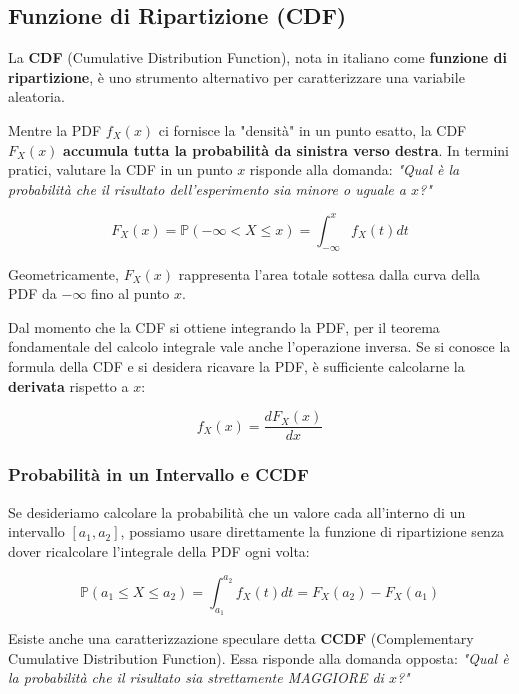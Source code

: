 \subsection{Funzione di Ripartizione (CDF)}

La \textbf{CDF} (Cumulative Distribution Function), nota in italiano come \textbf{funzione di ripartizione}, è uno strumento alternativo per caratterizzare una variabile aleatoria. 

Mentre la PDF $f_X(x)$ ci fornisce la "densità" in un punto esatto, la CDF $F_X(x)$ \textbf{accumula tutta la probabilità da sinistra verso destra}.
In termini pratici, valutare la CDF in un punto $x$ risponde alla domanda: \textit{"Qual è la probabilità che il risultato dell'esperimento sia minore o uguale a $x$?"}

\begin{equation}
F_X(x) = \mathbb{P}(-\infty < X \le x) = \int_{-\infty}^{x} f_X(t) dt
\end{equation}

Geometricamente, $F_X(x)$ rappresenta l'area totale sottesa dalla curva della PDF da $-\infty$ fino al punto $x$.

Dal momento che la CDF si ottiene integrando la PDF, per il teorema fondamentale del calcolo integrale vale anche l'operazione inversa. Se si conosce la formula della CDF e si desidera ricavare la PDF, è sufficiente calcolarne la \textbf{derivata} rispetto a $x$:

\begin{equation}
f_X(x) = \frac{d F_X(x)}{dx}
\end{equation}

\subsubsection{Probabilità in un Intervallo e CCDF}

Se desideriamo calcolare la probabilità che un valore cada all'interno di un intervallo $[a_1, a_2]$, possiamo usare direttamente la funzione di ripartizione senza dover ricalcolare l'integrale della PDF ogni volta:

\begin{equation}
\mathbb{P}(a_1 \le X \le a_2) = \int_{a_1}^{a_2} f_X(t) dt = F_X(a_2) - F_X(a_1)
\end{equation}

Esiste anche una caratterizzazione speculare detta \textbf{CCDF} (Complementary Cumulative Distribution Function). Essa risponde alla domanda opposta: \textit{"Qual è la probabilità che il risultato sia strettamente MAGGIORE di $x$?"}

